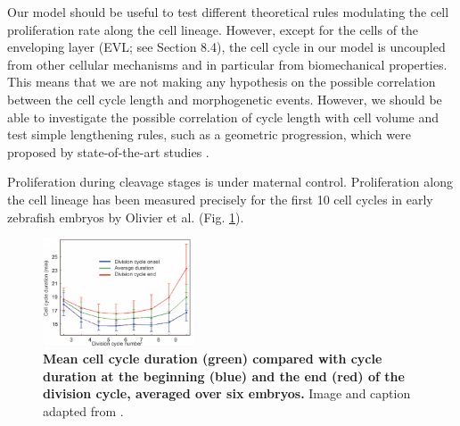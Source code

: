 Our model should be useful to test different theoretical rules modulating the cell proliferation rate along the cell lineage. However, except for the cells of the enveloping layer (EVL; see Section 8.4), the cell cycle in our model is uncoupled from other cellular mechanisms and in particular from biomechanical properties. This means that we are not making any hypothesis on the possible correlation between the cell cycle length and morphogenetic events. However, we should be able to investigate the possible correlation of cycle length with cell volume and test simple lengthening rules, such as a geometric progression, which were proposed by state-of-the-art studies \cite{Kane:1993wp}.

Proliferation during cleavage stages is under maternal control. Proliferation along the cell lineage has been measured precisely for the first 10 cell cycles in early zebrafish embryos by Olivier et al. \cite{Olivier:2010jz} (Fig. \ref{Case_1_Division_Olivieretal}).
\begin{figure}
\begin{center}
\includegraphics[width=0.4\textwidth]{../../images/Cases_Studies/Case_1_Division/Olivieretal_small.png}
\end{center}
\caption{\textbf{Mean cell cycle duration (green) compared with cycle duration at the beginning (blue) and the end (red) of the division cycle, averaged over six embryos.} Image and caption adapted from \cite{Olivier:2010jz}.}
\label{Case_1_Division_Olivieretal}
\end{figure}

